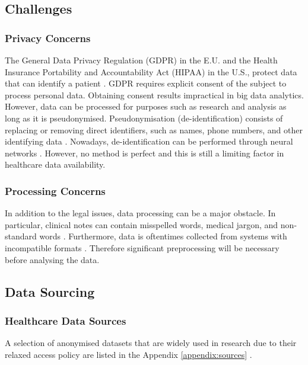 \documentclass[a4paper,11pt]{article}
\begin{document}
\subsection{Challenges}

\subsubsection{Privacy Concerns}

The General Data Privacy Regulation (GDPR) in the E.U. and the Health Insurance
Portability and Accountability Act (HIPAA) in the U.S., protect data that can
identify a patient \parencite{Iyengar2018}.
GDPR requires explicit consent of the subject to process personal data.
Obtaining consent results impractical in big data analytics.
However, data can be processed for purposes such as research and analysis as
long as it is pseudonymised.
Pseudonymisation (de-identification) consists of replacing or removing direct
identifiers, such as names, phone numbers, and other identifying data \parencite{Hintze2018}.
Nowadays, de-identification can be performed through neural networks \parencite{Dernoncourt2016}.
However, no method is perfect and this is still a limiting factor in healthcare
data availability.

\subsubsection{Processing Concerns}

In addition to the legal issues, data processing can be a major obstacle.
In particular, clinical notes can contain misspelled words, medical jargon,
and non-standard words \parencite{Dalianis2015}.
Furthermore, data is oftentimes collected from systems with incompatible formats
\parencite[34]{Consoli2019}.
Therefore significant preprocessing will be necessary before analysing the data.

\subsection{Data Sourcing}

\subsubsection{Healthcare Data Sources}

A selection of anonymised datasets that are widely used in research due to
their relaxed access policy are listed in the Appendix
\ref{appendix:sources} \parencite{Dalianis2015}.
\end{document}
